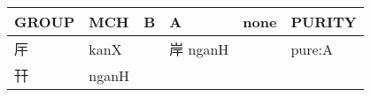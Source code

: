 \documentclass[14pt,a4paper]{scrartcl}
\begin{document}
\begin{longtable}[c]{@{}llllll@{}}
\toprule
\begin{minipage}[b]{0.14\columnwidth}\raggedright\strut
GROUP
\strut\end{minipage} &
\begin{minipage}[b]{0.14\columnwidth}\raggedright\strut
MCH
\strut\end{minipage} &
\begin{minipage}[b]{0.14\columnwidth}\raggedright\strut
B
\strut\end{minipage} &
\begin{minipage}[b]{0.14\columnwidth}\raggedright\strut
A
\strut\end{minipage} &
\begin{minipage}[b]{0.14\columnwidth}\raggedright\strut
none
\strut\end{minipage} &
\begin{minipage}[b]{0.14\columnwidth}\raggedright\strut
PURITY
\strut\end{minipage}\tabularnewline
\midrule
\endhead
\begin{minipage}[t]{0.14\columnwidth}\raggedright\strut
厈
\strut\end{minipage} &
\begin{minipage}[t]{0.14\columnwidth}\raggedright\strut
kanX
\strut\end{minipage} &
\begin{minipage}[t]{0.14\columnwidth}\raggedright\strut
\strut\end{minipage} &
\begin{minipage}[t]{0.14\columnwidth}\raggedright\strut
岸 nganH
\strut\end{minipage} &
\begin{minipage}[t]{0.14\columnwidth}\raggedright\strut
\strut\end{minipage} &
\begin{minipage}[t]{0.14\columnwidth}\raggedright\strut
pure:A
\strut\end{minipage}\tabularnewline
\begin{minipage}[t]{0.14\columnwidth}\raggedright\strut
幵
\strut\end{minipage} &
\begin{minipage}[t]{0.14\columnwidth}\raggedright\strut
nganH
\strut\end{minipage} &
\begin{minipage}[t]{0.14\columnwidth}\raggedright\strut
\strut\end{minipage} &
\begin{minipage}[t]{0.14\columnwidth}\raggedright\strut

\end{minipage}
\end{longtable}
\end{document}
